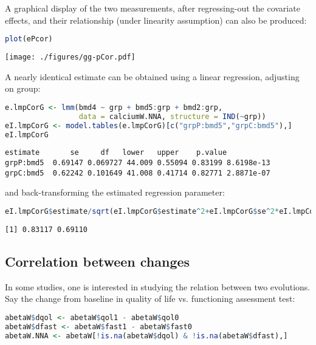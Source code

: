 \documentclass[12pt]{article}
\begin{document}
A graphical display of the two measurements, after regressing-out the
covariate effects, and their relationship (under linearity assumption)
can also be produced:
\begin{lstlisting}[language=r,numbers=none]
plot(ePcor)
\end{lstlisting}

\begin{center}
\texttt{[image: ./figures/gg-pCor.pdf]}
\end{center}

A nearly identical estimate can be obtained using a linear regression,
adjusting on group:
\begin{lstlisting}[language=r,numbers=none]
e.lmpCorG <- lmm(bmd4 ~ grp + bmd5:grp + bmd2:grp,
                 data = calciumW.NNA, structure = IND(~grp))
eI.lmpCorG <- model.tables(e.lmpCorG)[c("grpP:bmd5","grpC:bmd5"),]
eI.lmpCorG
\end{lstlisting}

\label{}
\begin{verbatim}
estimate       se     df   lower   upper    p.value
grpP:bmd5  0.69147 0.069727 44.009 0.55094 0.83199 8.6198e-13
grpC:bmd5  0.62242 0.101649 41.008 0.41714 0.82771 2.8871e-07
\end{verbatim}


and back-transforming the estimated regression parameter:
\begin{lstlisting}[language=r,numbers=none]
eI.lmpCorG$estimate/sqrt(eI.lmpCorG$estimate^2+eI.lmpCorG$se^2*eI.lmpCorG$df)
\end{lstlisting}

\label{}
\begin{verbatim}
[1] 0.83117 0.69110
\end{verbatim}





\clearpage
\subsection{Correlation between changes}
\label{sec:org3915464}

In some studies, one is interested in studying the relation between
two evolutions. Say the change from baseline in quality of life
vs. functioning assessment test:
\begin{lstlisting}[language=r,numbers=none]
abetaW$dqol <- abetaW$qol1 - abetaW$qol0
abetaW$dfast <- abetaW$fast1 - abetaW$fast0
abetaW.NNA <- abetaW[!is.na(abetaW$dqol) & !is.na(abetaW$dfast),]
\end{lstlisting}
\end{document}
